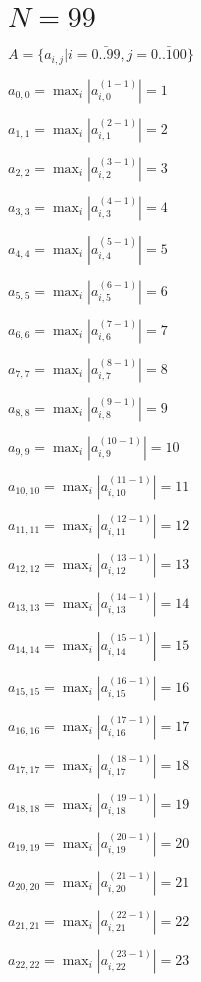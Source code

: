 \documentclass[a4paper,12pt]{article}
\begin{document}
\section{ $N = 99$ }
$A = \{ a _{ i, j } | i = \bar { 0..99 }, j = \bar { 0..100 } \}$

$a _{ 0, 0 } =  \max _i |a _{ i, 0 } ^{ (1 - 1) } | = 1$

$a _{ 1, 1 } =  \max _i |a _{ i, 1 } ^{ (2 - 1) } | = 2$

$a _{ 2, 2 } =  \max _i |a _{ i, 2 } ^{ (3 - 1) } | = 3$

$a _{ 3, 3 } =  \max _i |a _{ i, 3 } ^{ (4 - 1) } | = 4$

$a _{ 4, 4 } =  \max _i |a _{ i, 4 } ^{ (5 - 1) } | = 5$

$a _{ 5, 5 } =  \max _i |a _{ i, 5 } ^{ (6 - 1) } | = 6$

$a _{ 6, 6 } =  \max _i |a _{ i, 6 } ^{ (7 - 1) } | = 7$

$a _{ 7, 7 } =  \max _i |a _{ i, 7 } ^{ (8 - 1) } | = 8$

$a _{ 8, 8 } =  \max _i |a _{ i, 8 } ^{ (9 - 1) } | = 9$

$a _{ 9, 9 } =  \max _i |a _{ i, 9 } ^{ (10 - 1) } | = 10$

$a _{ 10, 10 } =  \max _i |a _{ i, 10 } ^{ (11 - 1) } | = 11$

$a _{ 11, 11 } =  \max _i |a _{ i, 11 } ^{ (12 - 1) } | = 12$

$a _{ 12, 12 } =  \max _i |a _{ i, 12 } ^{ (13 - 1) } | = 13$

$a _{ 13, 13 } =  \max _i |a _{ i, 13 } ^{ (14 - 1) } | = 14$

$a _{ 14, 14 } =  \max _i |a _{ i, 14 } ^{ (15 - 1) } | = 15$

$a _{ 15, 15 } =  \max _i |a _{ i, 15 } ^{ (16 - 1) } | = 16$

$a _{ 16, 16 } =  \max _i |a _{ i, 16 } ^{ (17 - 1) } | = 17$

$a _{ 17, 17 } =  \max _i |a _{ i, 17 } ^{ (18 - 1) } | = 18$

$a _{ 18, 18 } =  \max _i |a _{ i, 18 } ^{ (19 - 1) } | = 19$

$a _{ 19, 19 } =  \max _i |a _{ i, 19 } ^{ (20 - 1) } | = 20$

$a _{ 20, 20 } =  \max _i |a _{ i, 20 } ^{ (21 - 1) } | = 21$

$a _{ 21, 21 } =  \max _i |a _{ i, 21 } ^{ (22 - 1) } | = 22$

$a _{ 22, 22 } =  \max _i |a _{ i, 22 } ^{ (23 - 1) } | = 23$
\end{document}

